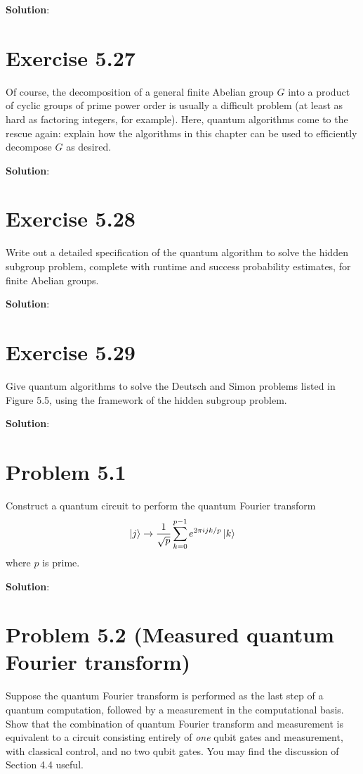 \documentclass{book}
\begin{document}
    \textbf{Solution}:
    
\section*{Exercise 5.27}
    Of course, the decomposition of a general finite Abelian group $G$ into a product of cyclic groups of prime power order is usually a difficult problem (at least as hard as factoring integers, for example). Here, quantum algorithms come to the rescue again: explain how the algorithms in this chapter can be used to efficiently decompose $G$ as desired.
    
    \textbf{Solution}:

\section*{Exercise 5.28}
    Write out a detailed specification of the quantum algorithm to solve the hidden subgroup problem, complete with runtime and success probability estimates, for finite Abelian groups.
    
    \textbf{Solution}:
    
\section*{Exercise 5.29}
    Give quantum algorithms to solve the Deutsch and Simon problems listed in Figure 5.5, using the framework of the hidden subgroup problem.
    
    \textbf{Solution}:

\section*{Problem 5.1}
    Construct a quantum circuit to perform the quantum Fourier transform
    \begin{align}
        \ket{j} \rightarrow \frac{1}{\sqrt{p}} \sum_{k=0}^{p-1} e^{2\pi ijk/p} \ket{k}
    \end{align}
    where $p$ is prime.
    
    \textbf{Solution}:

\section*{Problem 5.2 (Measured quantum Fourier transform)}
    Suppose the quantum Fourier transform is performed as the last step of a quantum computation, followed by a measurement in the computational basis. Show that the combination of quantum Fourier transform and measurement is equivalent to a circuit consisting entirely of \emph{one} qubit gates and measurement, with classical control, and no two qubit gates. You may find the discussion of Section 4.4 useful.
    
\end{document}
